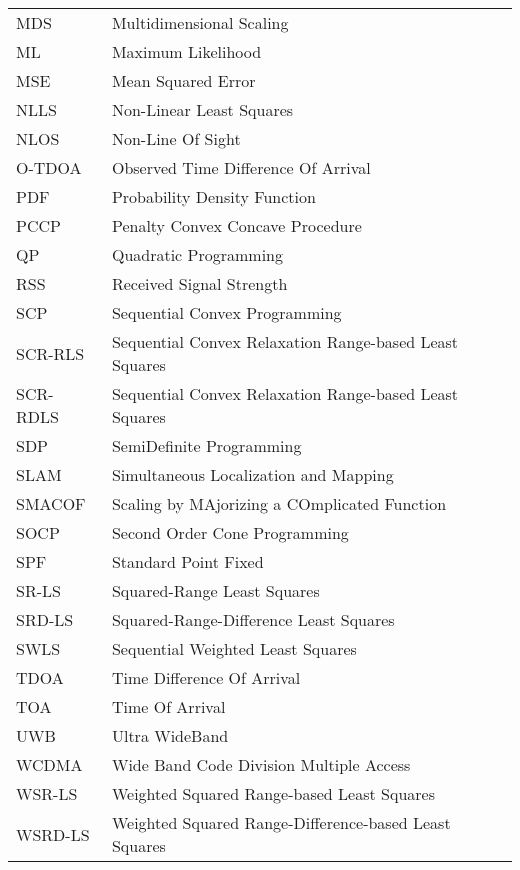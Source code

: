 \begin{longtable}[h]{l l}
MDS & Multidimensional Scaling \\ 

ML & Maximum Likelihood \\

MSE & Mean Squared Error\\

NLLS & Non-Linear Least Squares \\

NLOS & Non-Line Of Sight \\

O-TDOA & Observed Time Difference Of Arrival\\

PDF & Probability Density Function \\

PCCP & Penalty Convex Concave Procedure \\

QP & Quadratic Programming \\

RSS & Received Signal Strength \\

SCP & Sequential Convex Programming \\

SCR-RLS & Sequential Convex Relaxation Range-based Least Squares \\

SCR-RDLS & Sequential Convex Relaxation Range-based Least Squares\\

SDP & SemiDefinite Programming \\

SLAM & Simultaneous Localization and Mapping  \\

SMACOF & Scaling by MAjorizing a COmplicated Function \\

SOCP & Second Order Cone Programming \\

SPF & Standard  Point Fixed\\

SR-LS  & Squared-Range Least Squares \\

SRD-LS & Squared-Range-Difference Least Squares \\

SWLS & Sequential Weighted Least Squares \\

TDOA &  Time Difference Of Arrival \\

TOA & Time Of Arrival \\

UWB & Ultra WideBand \\

WCDMA & Wide Band Code Division Multiple Access \\

WSR-LS & Weighted Squared Range-based Least Squares \\

WSRD-LS & Weighted Squared Range-Difference-based Least Squares \\

\end{longtable}
